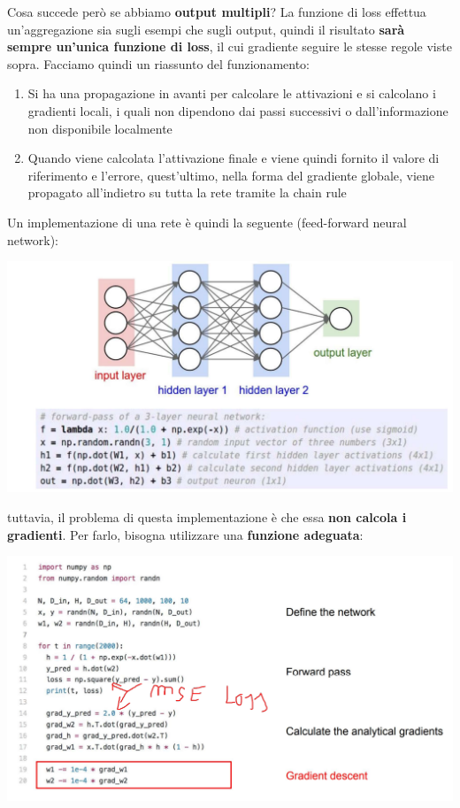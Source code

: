 \documentclass[12pt]{article}
\begin{document}
Cosa succede però se abbiamo \textbf{output multipli}? La funzione di loss effettua un'aggregazione sia sugli esempi che sugli output, quindi il risultato \textbf{sarà sempre un'unica funzione di loss}, il cui gradiente seguire le stesse regole viste sopra.
Facciamo quindi un riassunto del funzionamento:
\begin{enumerate}
    \item Si ha una propagazione in avanti per calcolare le attivazioni e si calcolano i gradienti locali, i quali non dipendono dai passi successivi o dall'informazione non disponibile localmente
    \item Quando viene calcolata l'attivazione finale e viene quindi fornito il valore di riferimento e l'errore, quest'ultimo, nella forma del gradiente globale, viene propagato all'indietro su tutta la rete tramite la chain rule
\end{enumerate}
Un implementazione di una rete è quindi la seguente (feed-forward neural network):
\begin{center}
    \includegraphics[width =0.90\linewidth]{Images/128.PNG}
\end{center}
tuttavia, il problema di questa implementazione è che essa \textbf{non calcola i gradienti}. Per farlo, bisogna utilizzare una \textbf{funzione adeguata}:
\begin{center}
    \includegraphics[width =1\linewidth]{Images/129.PNG}
\end{center}
\end{document}
